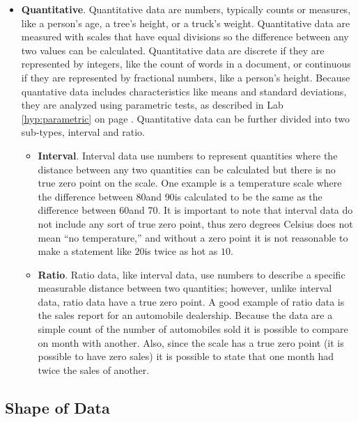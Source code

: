 \begin{itemize}
  \item \textbf{Quantitative}. Quantitative data are numbers, typically counts or measures, like a person's age, a tree's height, or a truck's weight. Quantitative data are measured with scales that have equal divisions so the difference between any two values can be calculated. Quantitative data are discrete if they are represented by integers, like the count of words in a document, or continuous if they are represented by fractional numbers, like a person's height. Because quantative data includes characteristics like means and standard deviations, they are analyzed using parametric tests, as described in Lab \ref{hyp:parametric} on page \pageref{hyp:parametric}. Quantitative data can be further divided into two sub-types, interval and ratio.
  
    \begin{itemize}
      \item \textbf{Interval}. Interval data use numbers to represent quantities where the distance between any two quantities can be calculated but there is no true zero point on the scale. One example is a temperature scale where the difference between $ 80 $\textdegree and $ 90 $\textdegree is calculated to be the same as the difference between $ 60 $\textdegree and $ 70 $\textdegree. It is important to note that interval data do not include any sort of true zero point, thus zero degrees Celsius does not mean ``no temperature,'' and without a zero point it is not reasonable to make a statement like $ 20 $\textdegree is twice as hot as $ 10 $\textdegree.
    
      \item \textbf{Ratio}. Ratio data, like interval data, use numbers to describe a specific measurable distance between two quantities; however, unlike interval data, ratio data have a true zero point. A good example of ratio data is the sales report for an automobile dealership. Because the data are a simple count of the number of automobiles sold it is possible to compare on month with another. Also, since the scale has a true zero point (it is possible to have zero sales) it is possible to state that one month had twice the sales of another.
    \end{itemize}
\end{itemize}
  
\subsection{Shape of Data}

